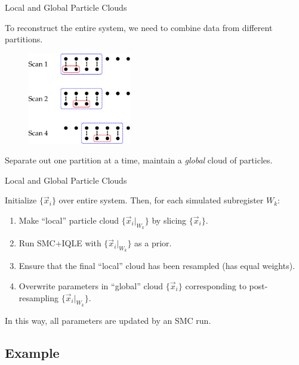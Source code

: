 \documentclass[xcolor=dvipsnames, compress]{beamer}
\begin{document}
\begin{frame}{Local and Global Particle Clouds}
  
  To reconstruct the entire system, we need to combine data from different partitions.
  
  \begin{figure}
    \centering
    \includegraphics[width=0.4\textwidth]{figures/scanning}
  \end{figure}

  Separate out one partition at a time, maintain a \emph{global} cloud of particles. 
  
\end{frame}

\begin{frame}{Local and Global Particle Clouds}

  Initialize $\{\vec{x}_i\}$ over entire system. Then, for each simulated subregister $W_k$:
  \begin{enumerate}
    \item Make ``local'' particle cloud $\{\vec{x}_i|_{W_k}\}$ by slicing $\{\vec{x}_i\}$.
    \item Run SMC+IQLE with $\{\vec{x}_i|_{W_k}\}$ as a prior.
    \item Ensure that the final ``local'' cloud has been resampled (has equal weights).
    \item Overwrite parameters in ``global'' cloud $\{\vec{x}_i\}$ corresponding
      to post-resampling $\{\vec{x}_i|_{W_k}\}$.
  \end{enumerate}

  In this way, all parameters are updated by an SMC run.

\end{frame}

\subsection{Example}
\end{document}
